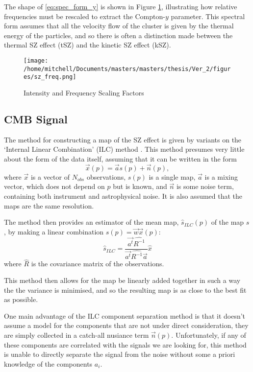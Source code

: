 The shape of \eqref{eq:spec_form_y} is shown in Figure \ref{fig:sz}, illustrating how relative frequencies must be rescaled to extract the Compton-$y$ parameter. This spectral form assumes that all the velocity flow of the cluster is given by the thermal energy of the particles, and so there is often a distinction made between the thermal SZ effect (tSZ) and the kinetic SZ effect (kSZ). 
\begin{figure}[h!]
\centering
\texttt{[image: /home/mitchell/Documents/masters/masters/thesis/Ver\_2/figures/sz\_freq.png]}
\caption{\sze Intensity and Frequency Scaling Factors}
\label{fig:sz}
\end{figure}

\subsection{CMB Signal}

The method for constructing a map of the SZ effect is given by variants on the `Internal Linear Combination' (ILC) method \citep{2011MNRAS.410.2481R}. This method presumes very little about the form of the data itself, assuming that it can be written in the form 
\begin{equation}
\vec{x}(p) = \vec{a} s(p) + \vec{n}(p),
\label{eq:ilc_1}
\end{equation}
where $\vec{x}$ is a vector of $N_{obs}$ observations, $s(p)$ is a single map, $\vec{a}$ is a mixing vector, which does not depend on $p$ but is known, and $\vec{n}$ is some noise term, containing both instrument and astrophysical noise. It is also assumed that the maps are the same resolution.

The method then provides an estimator of the mean map, $\hat{s}_{ILC}(p)$ of the map $s$, by making a linear combination $\hat{s}(p) = \vec{w} \vec{x}(p)$:
\begin{equation}
\hat{s}_{ILC} = \frac{\vec{a^t} \hat{R^{-1}}}{\vec{a^t} \hat{R^{-1}} \vec{a}} \hat{x}
\end{equation}
where $\hat{R}$ is the covariance matrix of the observations. 

This method then allows for the map be linearly added together in such a way the the variance is minimised, and so the resulting map is as close to the best fit as possible. 
\par One main advantage of the ILC component separation method is that it doesn't assume a model for the components that are not under direct consideration, they are simply collected in a catch-all nusiance term $\vec{n}(p)$. Unfortunately, if any of these components are correlated with the signals we are looking for, this method is unable to directly separate the signal from the noise without some a priori knowledge of the components $a_i$.

